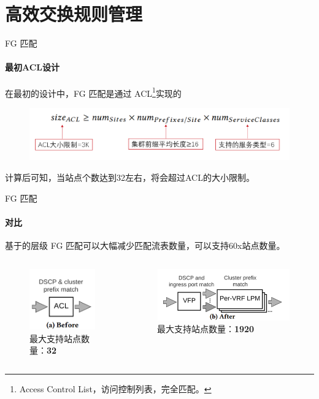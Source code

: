 \section{高效交换规则管理}
\begin{frame}{FG 匹配}
    \framesubtitle{最初ACL设计}
    在最初的设计中，FG 匹配是通过 ACL\footnote{Access Control List，访问控制列表，完全匹配。}实现的
    \begin{figure}
        \centering
        \includegraphics[width=0.7\linewidth]{img/FG.png}
        \label{fig:my_label}
    \end{figure}
    计算后可知，当站点个数达到32左右，将会超过ACL的大小限制。
\end{frame}

\begin{frame}{FG 匹配}
    \framesubtitle{对比}
    基于的层级 FG 匹配可以大幅减少匹配流表数量，可以支持\alert{60x}站点数量。
    \begin{columns}
        \begin{column}{0.4\textwidth}
            \begin{figure}
                \centering
                \includegraphics[width=0.4\linewidth]{img/FG2.png}
                \caption{最大支持站点数量：\textbf{32}}
            \end{figure}
        \end{column}
        \begin{column}{0.4\textwidth}
            \begin{figure}
                \centering
                \includegraphics[width=0.8\linewidth]{img/FG3.png}
                \caption{最大支持站点数量：\textbf{1920}}
            \end{figure}
        \end{column}
    \end{columns}
\end{frame}

